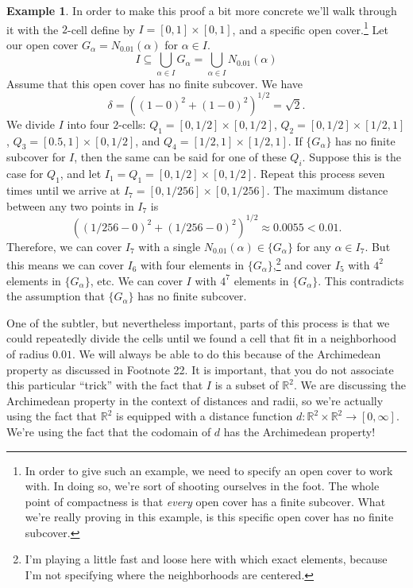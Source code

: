 \documentclass{article}
\newcommand{\R}{\mathbb{R}}
\theoremstyle{definition}
\newtheorem{example}{Example}[section]
\begin{document}
	\begin{example}
		In order to make this proof a bit more concrete we'll walk through it with the $ 2 $-cell define by $ I=[0,1]\times[0,1] $, and a specific open cover.\footnote{In order to give such an example, we need to specify an open cover to work with. In doing so, we're sort of shooting ourselves in the foot. The whole point of compactness is that \textit{every} open cover has a finite subcover. What we're really proving in this example, is this specific open cover has no finite subcover.} Let our open cover $ G_\alpha=N_{0.01}(\alpha)  $ for $ \alpha\in I $. $$ I\subseteq \bigcup_{\alpha\in I} G_\alpha=\bigcup_{\alpha\in I}N_{0.01}(\alpha)$$  Assume that this open cover has no finite subcover. We have $$ \delta=((1-0)^2+(1-0)^2)^{1/2}=\sqrt{2} .$$ We divide $ I $ into four $ 2 $-cells: $ Q_1=[0,1/2]\times[0,1/2] $, $Q_2=[0,1/2]\times[1/2,1]$, $ Q_3=[0.5,1]\times[0,1/2] $, and $ Q_4=[1/2,1]\times[1/2,1] $. If $ \{G_\alpha\} $ has no finite subcover for $ I $, then the same can be said for one of these $ Q_i $. Suppose this is the case for $ Q_1 $, and let $ I_1=Q_1=[0,1/2]\times[0,1/2] $. Repeat this process seven times until we arrive at $ I_7=[0,1/256]\times[0,1/256] $. The maximum distance between any two points in $ I_7 $ is $$ \left((1/256-0)^2+(1/256-0)^2\right)^{1/2}\approx0.0055<0.01.$$ Therefore, we can cover $ I_7 $ with a single $ N_{0.01}(\alpha) \in\{G_\alpha\}$ for any $ \alpha\in I_7 $. But this means we can cover $ I_6 $ with four elements in $ \{G_\alpha\} $,\footnote{I'm playing a little fast and loose here with which exact elements, because I'm not specifying where the neighborhoods are centered.}  and cover $ I_5 $ with $ 4^2 $ elements in $ \{G_\alpha\}  $, etc. We can cover $ I $ with $ 4^7 $ elements in $ \{G_\alpha\} $. This contradicts the assumption that $ \{G_\alpha\} $ has no finite subcover. 
		
		One of the subtler, but nevertheless important, parts of this process is that we could repeatedly divide the cells until we found a cell that fit in a neighborhood of radius $ 0.01 $. We will always be able to do this because of the Archimedean property as discussed in Footnote 22. It is important, that you do not associate this particular ``trick'' with the fact that $ I $ is a subset of $ \R^2 $. We are discussing the Archimedean property in the context of distances and radii, so we're actually using the fact that $ \R^2  $ is equipped with a distance function $ d:\R^2\times\R^2\to[0,\infty] $. We're using the fact that the codomain of $ d $ has the Archimedean property!  
	\end{example}
\end{document}
